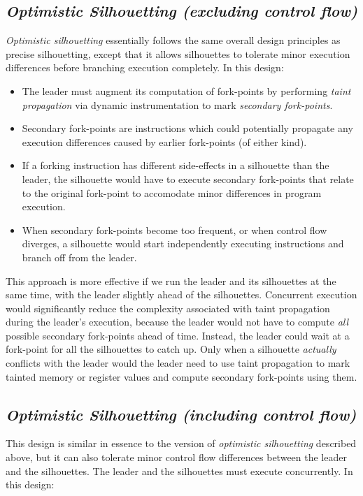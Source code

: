 \subsection{\em Optimistic Silhouetting (excluding control flow)}\label{opt:sil}
{\em Optimistic silhouetting} essentially follows the 
same overall design principles
as precise silhouetting,
except that it allows silhouettes
to tolerate minor execution differences 
before branching execution completely.
In this design:

\begin{itemize}

\item The leader must augment its
computation of fork-points by performing 
{\em taint propagation} via dynamic instrumentation to 
mark {\em secondary fork-points}.

\item Secondary fork-points are instructions which 
could potentially propagate any execution differences
caused by earlier fork-points (of either kind).

\item If a forking 
instruction has different
side-effects in a silhouette
than the leader,
the silhouette would have to 
execute secondary fork-points
that relate to the original fork-point to 
accomodate minor differences in program execution.

\item When secondary fork-points 
become too frequent, or when
control flow diverges,
a silhouette would start
independently executing instructions
and branch off from the leader.

\end{itemize}

This approach is more effective if we
run the leader and its silhouettes
at the same time, with the leader
slightly ahead of the silhouettes.
Concurrent execution would significantly reduce
the complexity associated with taint propagation
during the leader's execution,
because the leader would
not have to compute
{\em all} possible secondary fork-points
ahead of time.
Instead, the leader could wait at 
a fork-point for all the silhouettes
to catch up. Only when a silhouette
{\em actually} conflicts with the leader would
the leader need to use taint propagation
to mark tainted memory or register values and
compute secondary fork-points using them.

\subsection{\em Optimistic Silhouetting (including control flow)}\label{opt:sil}
This design is similar in essence to the version of {\em optimistic silhouetting}  
described above, but it can also tolerate minor control flow
differences between the leader and the silhouettes. The leader and the
silhouettes must execute concurrently. In this design:

